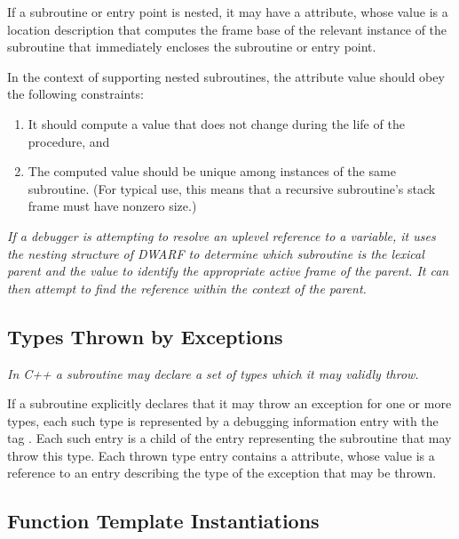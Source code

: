 If a subroutine or entry point is nested, it may have a
 attribute, whose value is a location
description that computes the frame base of the relevant
instance of the subroutine that immediately encloses the
subroutine or entry point.

In the context of supporting nested subroutines, the
 attribute value should obey the following
constraints:

\begin{enumerate}[1.]
\item It should compute a value that does not change during the
life of the procedure, and

\item The computed value should be unique among instances of
the same subroutine. (For typical  use, this
means that a recursive subroutine’s stack frame must have
non\dash zero size.)
\end{enumerate}

\textit{If a debugger is attempting to resolve an up\dash level reference
to a variable, it uses the nesting structure of DWARF to
determine which subroutine is the lexical parent and the
 value to identify the appropriate active
frame of the parent. It can then attempt to find the reference
within the context of the parent.}



\subsection{Types Thrown by Exceptions}
\label{chap:typesthrownbyexceptions}

\textit{In C++ a subroutine may declare a set of types which
it may validly throw.}

If a subroutine explicitly declares that it may throw
an exception for one or more types, each such type is
represented by a debugging information entry with the tag
.  
Each such entry is a child of the entry
representing the subroutine that may throw this type. Each
thrown type entry contains a  attribute, whose
value is a reference to an entry describing the type of the
exception that may be thrown.

\subsection{Function Template Instantiations}
\label{chap:functiontemplateinstantiations}

